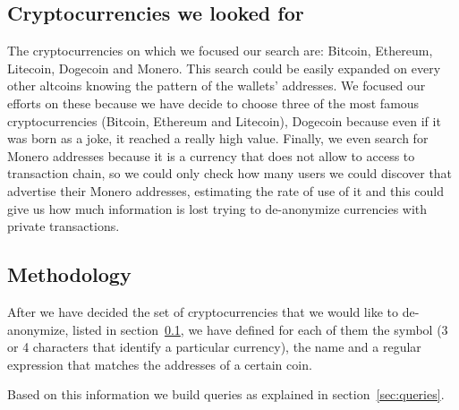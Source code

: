 \subsection{Cryptocurrencies we looked for}
\label{subsec:currencies}
The cryptocurrencies on which we focused our search are: Bitcoin, Ethereum,
Litecoin, Dogecoin and Monero. This search could be easily expanded on every
other altcoins knowing the pattern of the wallets' addresses. We focused our
efforts on these because we have decide to choose three of the most famous
cryptocurrencies (Bitcoin, Ethereum and Litecoin), Dogecoin because even if
it was born as a joke, it reached a really high value. Finally, we even
search for Monero addresses because it is a currency that does not allow to
access to transaction chain, so we could only check how many users we could
discover that advertise their Monero addresses, estimating the rate of use of
it and this could give us how much information is lost trying to de-anonymize
currencies with private transactions.

\subsection{Methodology}
\label{sec:methodology}
After we have decided the set of cryptocurrencies that we would like to
de-anonymize, listed in section~\ref{subsec:currencies}, we have defined for
each of them the symbol (3 or 4 characters that identify a particular
currency), the name and a regular expression that matches the addresses of a
certain coin.

Based on this information we build queries as explained in
section~\ref{sec:queries}.
